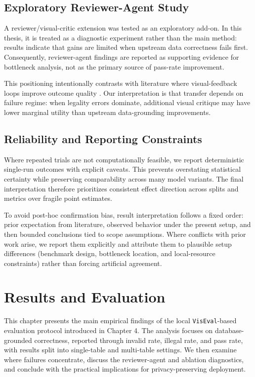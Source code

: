 \documentclass[a4paper,oneside,bibliography=totoc]{scrbook}
\begin{document}
\section{Exploratory Reviewer-Agent Study}

A reviewer/visual-critic extension was tested as an exploratory add-on. In this thesis, it is treated as a diagnostic experiment rather than the main method: results indicate that gains are limited when upstream data correctness fails first. Consequently, reviewer-agent findings are reported as supporting evidence for bottleneck analysis, not as the primary source of pass-rate improvement.

This positioning intentionally contrasts with literature where visual-feedback loops improve outcome quality \cite{yang2024matplotagent,shi2025visref}. Our interpretation is that transfer depends on failure regime: when legality errors dominate, additional visual critique may have lower marginal utility than upstream data-grounding improvements.

\section{Reliability and Reporting Constraints}

Where repeated trials are not computationally feasible, we report deterministic single-run outcomes with explicit caveats. This prevents overstating statistical certainty while preserving comparability across many model variants. The final interpretation therefore prioritizes consistent effect direction across splits and metrics over fragile point estimates.

To avoid post-hoc confirmation bias, result interpretation follows a fixed order: prior expectation from literature, observed behavior under the present setup, and then bounded conclusions tied to scope assumptions. Where conflicts with prior work arise, we report them explicitly and attribute them to plausible setup differences (benchmark design, bottleneck location, and local-resource constraints) rather than forcing artificial agreement.

\chapter{Results and Evaluation}

This chapter presents the main empirical findings of the local \texttt{VisEval}-based evaluation protocol introduced in Chapter 4. The analysis focuses on database-grounded correctness, reported through invalid rate, illegal rate, and pass rate, with results split into single-table and multi-table settings. We then examine where failures concentrate, discuss the reviewer-agent and ablation diagnostics, and conclude with the practical implications for privacy-preserving deployment.
\end{document}
